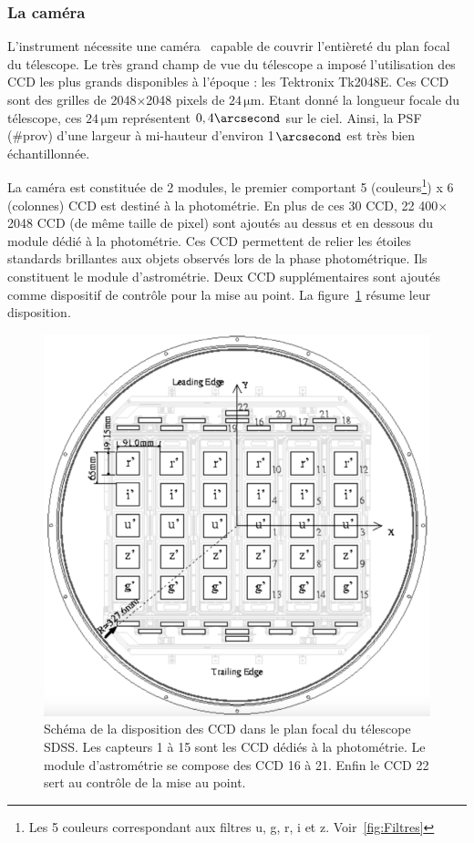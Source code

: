 \documentclass[11pt, twoside, a4paper, openright]{report}
\begin{document}
\subsubsection{La caméra}
L'instrument nécessite une caméra~\cite{Gunn1998} capable de couvrir l'entièreté du plan focal du télescope. Le très grand champ de vue du télescope a imposé l'utilisation des CCD les plus grands disponibles à l'époque : les Tektronix Tk2048E. Ces CCD sont des grilles de \num{2048}$\times$\num{2048} pixels de $24\,\mathrm{\mu m}$. Etant donné la longueur focale du télescope, ces $24\,\mathrm{\mu m}$ représentent $0,4\arcsecond$ sur le ciel. Ainsi, la PSF (\#prov) d'une largeur à mi-hauteur d'environ 1$\arcsecond$ est très bien échantillonnée.

La caméra est constituée de 2 modules, le premier comportant 5 (couleurs\footnote{Les 5 couleurs correspondant aux filtres u, g, r, i et z. Voir~\ref{fig:Filtres}}) x 6 (colonnes) CCD est destiné à la photométrie. En plus de ces 30 CCD, 22 \num{400}$\times$\num{2048} CCD (de même taille de pixel) sont ajoutés au dessus et en dessous du module dédié à la photométrie. Ces CCD permettent de relier les étoiles standards brillantes aux objets observés lors de la phase photométrique. Ils constituent le module d'astrométrie. Deux CCD supplémentaires sont ajoutés comme dispositif de contrôle pour la mise au point. La figure~\ref{fig:CcdSchema} résume leur disposition.
\begin{figure}
  \centering
  \includegraphics[scale=0.3]{../img/eBOSS/CcdSchema}
  \caption{Schéma de la disposition des CCD dans le plan focal du télescope SDSS. Les capteurs 1 à 15 sont les CCD dédiés à la photométrie. Le module d'astrométrie se compose des CCD 16 à 21. Enfin le CCD 22 sert au contrôle de la mise au point.}
  \label{fig:CcdSchema}
\end{figure}
\end{document}
